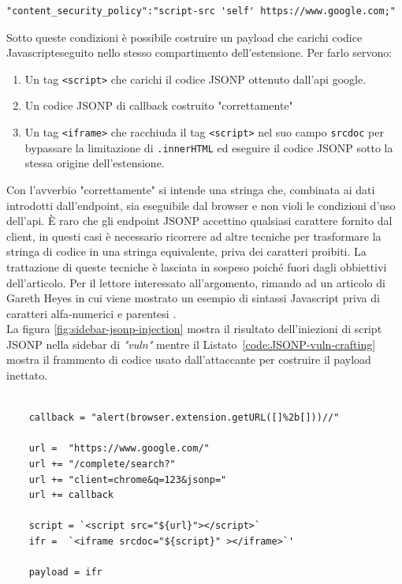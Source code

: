 \documentclass{sapthesis}
\newcommand{\code}[1]{\texttt{#1}}
\newcommand{\attr}[1]{\code{.#1}}
\newcommand{\refCode}[1]{Listato~\ref{#1}}
\newcommand{\vuln}{\textit{"vuln"}}
\newcommand{\JS}{Javascript}
\newcommand{\manifest}{\code{manifest.json} }
\newcommand{\tagHTML}[1]{\code{<#1>}}
\newcommand{\script}{\tagHTML{script}}
\newcommand{\iframe}{\tagHTML{iframe}}
\begin{document}
                \begin{lstlisting}[label=code:vuln-manifest-google,caption={Voce \code{"content\_security\_policy"} nel \manifest{} di \vuln{}}]
"content_security_policy":"script-src 'self' https://www.google.com;"
                \end{lstlisting}

                Sotto queste condizioni è possibile costruire un payload che carichi
                codice \JS eseguito nello stesso compartimento dell'estensione. 
                Per farlo servono:
                \begin{enumerate}
                    \item Un tag \script{} che carichi il codice JSONP ottenuto dall'api google.
                    \item Un codice JSONP di callback costruito "correttamente"
                    \item Un tag \iframe{} che racchiuda il tag \script{} nel suo campo \code{srcdoc}
                            per bypassare la limitazione di \attr{innerHTML} ed eseguire il codice
                            JSONP sotto la stessa origine dell'estensione.
                \end{enumerate}
                Con l'avverbio "correttamente" si intende una stringa che, combinata ai dati
                introdotti dall'endpoint, sia eseguibile dal browser e non violi le condizioni
                d'uso dell'api. È raro che gli endpoint JSONP accettino qualsiasi carattere 
                fornito dal client, in questi casi è necessario ricorrere ad altre tecniche per
                trasformare la stringa di codice in una stringa equivalente, priva dei caratteri
                proibiti. La trattazione di queste tecniche è lasciata in sospeso poiché fuori dagli
                obbiettivi dell'articolo. Per il lettore interessato all'argomento, rimando ad un
                articolo di Gareth Heyes in cui viene mostrato un esempio di sintassi \JS{} priva di caratteri
                alfa-numerici e parentesi \cite{gareth-heyes-js-no-alphanum}.\\
                La figura \ref{fig:sidebar-jsonp-injection} mostra il risultato dell'iniezioni di
                script JSONP nella sidebar di \vuln{} mentre il \refCode{code:JSONP-vuln-crafting} 
                mostra il frammento di codice usato dall'attaccante per costruire il payload inettato.
                
                \begin{lstlisting}[label=code:JSONP-vuln-crafting]
    
    callback = "alert(browser.extension.getURL([]%2b[]))//"     
    
    url =  "https://www.google.com/"
    url += "/complete/search?"
    url += "client=chrome&q=123&jsonp="
    url += callback  
    
    script = `<script src="${url}"></script>`
    ifr =  `<iframe srcdoc="${script}" ></iframe>`' 
    
    payload = ifr
                \end{lstlisting}
\end{document}
